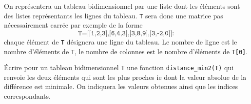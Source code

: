 



\question{} On représentera un tableau bidimensionnel par une liste dont les éléments sont des listes représentants les lignes du tableau. \texttt{T} sera donc une matrice pas nécessairement carrée par exemple de la forme $$\texttt{T=[[1,2,3],[6,4,3],[3,8,9],[3,-2,0]]}:$$ chaque élément de \texttt{T} désignera une ligne du tableau. Le nombre de ligne est le nombre d'éléments de \texttt{T}, le nombre de colonnes est le nombre d'éléments de \texttt{T[0]}.

\'Ecrire pour un tableau bidimensionnel \texttt{T}  une fonction \texttt{distance\_min2(T)} qui renvoie les deux éléments qui sont les plus proches ie dont la valeur absolue de la différence est minimale. On indiquera les valeurs obtenues ainsi que les indices correspondants.



